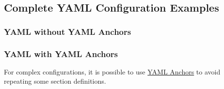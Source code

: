 \subsection{Complete YAML Configuration Examples}

\subsubsection{YAML without YAML Anchors}

\subsubsection{YAML with YAML Anchors}

For complex configurations, it is possible to use 
\href{https://docs.docker.com/compose/compose-file/10-fragments/}{YAML Anchors}
to avoid repeating some section definitions.
